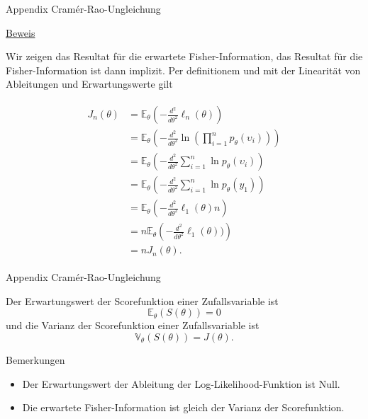 \documentclass[
  8pt,
  ignorenonframetext,
]{beamer}
\providecommand{\tightlist}{%
  \setlength{\itemsep}{0pt}\setlength{\parskip}{0pt}}
\newcommand{\ups} {\upsilon}
\begin{document}
\begin{frame}{Appendix \textbar{} Cramér-Rao-Ungleichung}
\protect\hypertarget{appendix-cramuxe9r-rao-ungleichung-4}{}
\footnotesize

\underline{Beweis}

Wir zeigen das Resultat für die erwartete Fisher-Information, das
Resultat für die Fisher-Information ist dann implizit. Per definitionem
und mit der Linearität von Ableitungen und Erwartungswerte gilt

\tiny

\begin{align}
\begin{split}
J_n(\theta)
& = \mathbb{E}_\theta\left(-\frac{d^2}{d\theta^2} \ell_n(\theta)\right) \\
& = \mathbb{E}_\theta\left(-\frac{d^2}{d\theta^2} \ln \left(\prod_{i=1}^n p_\theta(\ups_i)\right)\right) \\
& = \mathbb{E}_\theta\left(-\frac{d^2}{d\theta^2} \sum_{i=1}^n \ln p_\theta(\ups_i)\right) \\
& = \mathbb{E}_\theta\left(-\frac{d^2}{d\theta^2} \sum_{i=1}^n \ln p_\theta(y_1)\right) \\
& = \mathbb{E}_\theta\left(-\frac{d^2}{d\theta^2} \ell_1(\theta)n\right) \\
& =  n \mathbb{E}_\theta\left(-\frac{d^2}{d\theta^2}\ell_1(\theta))\right) \\
& =  n J_n(\theta).
\end{split}
\end{align}
\end{frame}

\begin{frame}{Appendix \textbar{} Cramér-Rao-Ungleichung}
\protect\hypertarget{appendix-cramuxe9r-rao-ungleichung-5}{}
\small
\begin{theorem}
\normalfont
\justifying
Der Erwartungswert der Scorefunktion einer Zufallsvariable ist
\begin{equation}
\mathbb{E}_\theta(S(\theta)) = 0
\end{equation}
und die Varianz der Scorefunktion einer Zufallsvariable ist
\begin{equation}
\mathbb{V}_\theta(S(\theta)) = J(\theta).
\end{equation}
\end{theorem}

\footnotesize

Bemerkungen

\begin{itemize}
\tightlist
\item
  Der Erwartungswert der Ableitung der Log-Likelihood-Funktion ist Null.
\item
  Die erwartete Fisher-Information ist gleich der Varianz der
  Scorefunktion.
\end{itemize}
\end{frame}
\end{document}
